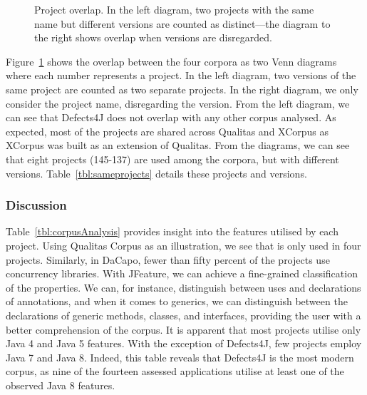 \begin{figure}[b]
\centering

\caption{\label{fig:corporaOverlap} Project overlap. In the left diagram, two projects with the same name but different versions are counted as distinct---the diagram to the right shows overlap when versions are disregarded.}
\end{figure}
Figure~\ref{fig:corporaOverlap} shows the overlap between the four corpora as two Venn diagrams where each number represents a project. In the left diagram,  two versions of the same project are counted as two separate projects. In the right diagram, we only consider the project name, disregarding the version.
From the left diagram, we can see that Defects4J does not overlap with any other corpus analysed. As expected, most of the projects are shared across Qualitas and XCorpus as XCorpus was built as an extension of Qualitas. From the diagrams, we can see that eight projects (145-137) are used among the corpora, but with different versions. Table~\ref{tbl:sameprojects} details these projects and versions.




\subsubsection*{\textbf{Discussion}}
Table~\ref{tbl:corpusAnalysis} provides insight into the features utilised by each project. Using Qualitas Corpus as an illustration, we see that  is only used in four projects.
Similarly, in DaCapo, fewer than fifty percent of the projects use concurrency libraries.
With JFeature, we can achieve a fine-grained classification of the properties. We can, for instance, distinguish between uses and declarations of annotations, and when it comes to generics, we can distinguish between the declarations of generic methods, classes, and interfaces, providing the user with a better comprehension of the corpus.
It is apparent that most projects utilise only Java 4 and Java 5 features. With the exception of Defects4J, few projects employ Java 7 and Java 8.
Indeed, this table reveals that Defects4J is the most modern corpus, as nine of the fourteen assessed applications utilise at least one of the observed Java 8 features.


